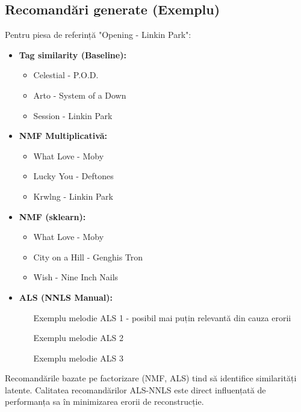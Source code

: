 \documentclass[12pt,a4paper]{article}
\begin{document}
\subsection{Recomandări generate (Exemplu)}
Pentru piesa de referință "Opening - Linkin Park":
\begin{itemize}
\item \textbf{Tag similarity (Baseline):}
\begin{itemize}
\item Celestial - P.O.D.
\item Arto - System of a Down
\item Session - Linkin Park
\end{itemize}
\item \textbf{NMF Multiplicativă:}
\begin{itemize}
\item What Love - Moby
\item Lucky You - Deftones
\item Krwlng - Linkin Park
\end{itemize}
\item \textbf{NMF (sklearn):}
\begin{itemize}
\item What Love - Moby
\item City on a Hill - Genghis Tron
\item Wish - Nine Inch Nails
\end{itemize}
\item \textbf{ALS (NNLS Manual):} 
\begin{itemize}
\item [Exemplu melodie ALS 1 - posibil mai puțin relevantă din cauza erorii]
\item [Exemplu melodie ALS 2]
\item [Exemplu melodie ALS 3]
\end{itemize}
\end{itemize}
Recomandările bazate pe factorizare (NMF, ALS) tind să identifice similarități latente. Calitatea recomandărilor ALS-NNLS este direct influențată de performanța sa în minimizarea erorii de reconstrucție.
\end{document}
